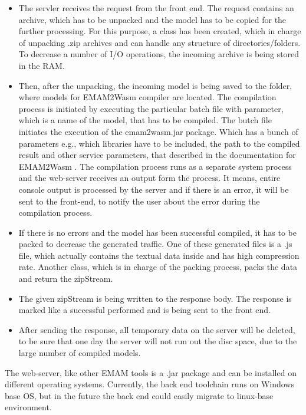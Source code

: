 \begin{itemize}
    \item The servler receives the request from the front end. The request contains an archive, which has to be unpacked and the model has to be copied for the further processing. For this purpose, a class has been created, which in charge of unpacking .zip archives and can handle any structure of directories/folders. To decrease a number of I/O operations, the incoming archive is being stored in the RAM.
    \item Then, after the unpacking, the incoming model is being saved to the folder, where models for EMAM2Wasm compiler are located. The compilation process is initiated by executing the particular batch file with parameter, which is a name of the model, that has to be compiled. The butch file initiates the execution of the emam2wasm.jar package. Which has a bunch of parameters e.g., which libraries have to be included, the path to the compiled result and other service parameters, that described in the documentation for EMAM2Wasm \cite{EMAM2Wasm}. The compilation process runs as a separate system process and the web-server receives an output form the process. It means, entire console output is processed by the server and if there is an error, it will be sent to the front-end, to notify the user about the error during the compilation process.
    \item If there is no errors and the model has been successful compiled, it has to be packed to decrease the generated traffic. One of these generated files is a .js file, which actually contains the textual data inside and has high compression rate. Another class, which is in charge of the packing process, packs the data and return the zipStream.
    \item The given zipStream is being written to the response body. The response is marked like a successful performed and is being sent to the front end.
    \item After sending the response, all temporary data on the server will be deleted, to be sure that one day the server will not run out the disc space, due to the large number of compiled models.
\end{itemize}
The web-server, like other EMAM tools is a .jar package and can be installed on different operating systems. Currently, the back end toolchain runs on Windows base OS, but in the future the back end could easily migrate to linux-base environment.


